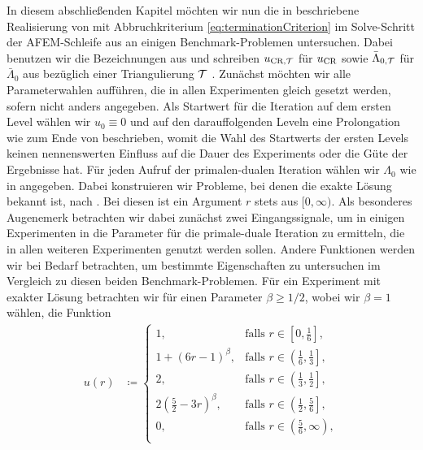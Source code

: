 \newcommand{\precDTL}{5} %
In diesem abschließenden Kapitel möchten wir nun die in
 beschriebene Realisierung von
 mit Abbruchkriterium
\eqref{eq:terminationCriterion} im Solve-Schritt der AFEM-Schleife aus
 an einigen Benchmark-Problemen untersuchen.
Dabei benutzen wir die Bezeichnungen aus  und
schreiben $u_{\textup{CR}, \mathcal{T}}$ für $u_\textup{CR}$ sowie $\bar\Lambda_{0,\mathcal{T}}$ für $\bar\Lambda_0$
aus  bezüglich einer Triangulierung $\mathcal{T}$ .
Zunächst möchten wir alle Parameterwahlen aufführen, die in allen 
Experimenten gleich gesetzt werden, sofern nicht anders angegeben.
Als Startwert für die Iteration auf dem ersten Level wählen wir
$u_0\equiv 0$ und auf den darauffolgenden Leveln eine Prolongation wie zum
Ende von  beschrieben, womit die Wahl des Startwerts
der ersten Levels keinen nennenswerten Einfluss auf die Dauer des Experiments
oder die Güte der Ergebnisse hat. 
Für jeden Aufruf der primalen-dualen Iteration wählen wir $\Lambda_0$ wie in
 angegeben.
Dabei konstruieren wir Probleme, bei denen die exakte Lösung bekannt ist,
nach . 
Bei diesen ist ein Argument $r$ stets aus $[0,\infty)$.
Als besonderes Augenemerk betrachten wir dabei zunächst zwei Eingangssignale,
um in einigen Experimenten in  die Parameter für
die primale-duale Iteration zu ermitteln, die in allen weiteren Experimenten
genutzt werden sollen.
Andere Funktionen werden wir bei Bedarf betrachten, um bestimmte Eigenschaften
zu untersuchen im Vergleich zu diesen beiden Benchmark-Problemen.
Für ein Experiment mit exakter Lösung betrachten wir für einen Parameter
$\beta\geq 1/2$, wobei wir $\beta =1$ wählen, die Funktion
\begin{align*}
  u(r)&\coloneqq
  \begin{cases}
    1, 
    & \text{falls } r\in \left[0,\frac{1}{6}\right]\!,\\
    1+(6r-1)^\beta, 
    & \text{falls } r\in \left(\frac{1}{6}, \frac{1}{3}\right]\!,\\
    2, 
    & \text{falls } r\in \left(\frac{1}{3}, \frac{1}{2}\right]\!,\\
    2\left(\frac{5}{2}-3r\right)^\beta, 
    & \text{falls } r\in \left(\frac{1}{2}, \frac{5}{6}\right]\!,\\
    0, 
    & \text{falls } r\in \left(\frac{5}{6}, \infty\right)\!,\\
  \end{cases}
\end{align*}
